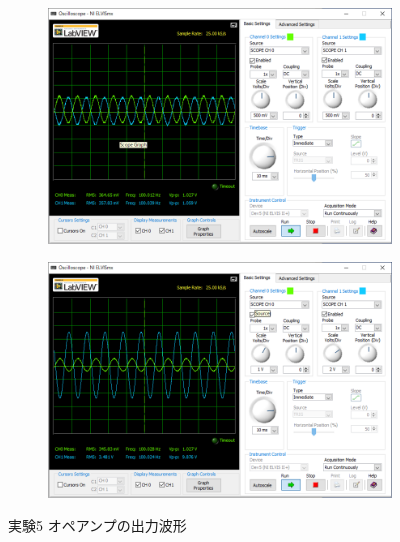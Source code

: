\begin{figure}[!htb]
    \centering
    \centering
    \begin{subfigure}{0.48\linewidth}
        \centering
        \includegraphics[width=0.8\linewidth]{src/figures/exp5/amp-10k.png}
        \label{fig:exp5-raw-10k}
    \end{subfigure}
    \begin{subfigure}{0.48\linewidth}
        \centering
        \includegraphics[width=0.8\linewidth]{src/figures/exp5/amp-1k.png}
        \label{fig:exp5-raw-1k}
    \end{subfigure}
    \caption{実験5 オペアンプの出力波形}\label{fig:exp5-raw}
\end{figure}
